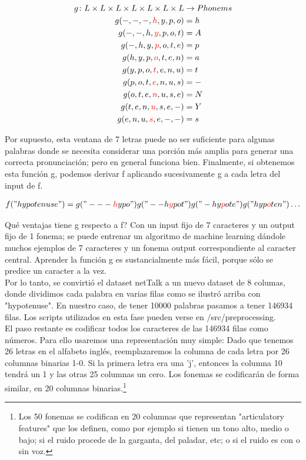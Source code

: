 \documentclass[paper=a4, fontsize=11pt]{scrartcl} %
\numberwithin{equation}{section} %
\numberwithin{figure}{section} %
\numberwithin{table}{section} %
\begin{document}
\begin{align*}
  g \colon L \times L \times L \times L \times L \times L \times L  & \to Phonems \\
  g(-,-,-,\textcolor{red}{h},y,p,o) &= h \\  
  g(-,-,h,\textcolor{red}{y},p,o,t) &= A \\
  g(-,h,y,\textcolor{red}{p},o,t,e) &= p \\
  g(h,y,p,\textcolor{red}{o},t,e,n) &= a \\
  g(y,p,o,\textcolor{red}{t},e,n,u) &= t \\
  g(p,o,t,\textcolor{red}{e},n,u,s)& = - \\
  g(o,t,e,\textcolor{red}{n},u,s,e)& = N \\
  g(t,e,n,\textcolor{red}{u},s,e,-)& = Y \\
  g(e,n,u,\textcolor{red}{s},e,-,-) &= s
\end{align*}

Por supuesto, esta ventana de 7 letras puede no ser suficiente para algunas palabras donde se necesita considerar una porción más amplia para generar una correcta pronunciación; pero en general funciona bien. Finalmente, si obtenemos esta función g, podemos derivar f aplicando sucesivamente g a cada letra del input de f. 

\begin{align*}
  f("hypotenuse") = g("---\textcolor{red}{h}ypo")  g("--h\textcolor{red}{y}pot") g("-hy\textcolor{red}{p}ote") g("hyp\textcolor{red}{o}ten")  \ldots
\end{align*}


Qué ventajas tiene g respecto a f? Con un input fijo de 7 caracteres y un output fijo de 1 fonema; se puede entrenar un algoritmo de machine learning dándole muchos ejemplos de 7 caracteres y un fonema output correspondiente al caracter central. Aprender la función g es sustancialmente más fácil, porque sólo se predice un caracter a la vez. \\

Por lo tanto, se convirtió el dataset netTalk a un nuevo dataset de 8 columas, donde dividimos cada palabra en varias filas como se ilustró arriba con "hypotenuse". En nuestro caso, de tener 10000 palabras pasamos a tener 146934 filas. Los scripts utilizados en esta fase pueden verse en /src/preprocessing. \\

El paso restante es codificar todos los caracteres de las 146934 filas como números. Para ello usaremos una representación muy simple: Dado que tenemos 26 letras en el alfabeto inglés, reemplazaremos la columna de cada letra por 26 columnas binarias 1-0. Si la primera letra era una 'j', entonces la columna 10 tendrá un 1 y las otras 25 columnas un cero. Los fonemas se codificarán de forma similar, en 20 columnas binarias.\footnote{Los 50 fonemas se codifican en 20 columnas que representan "articulatory features" que los definen, como por ejemplo si tienen un tono alto, medio o bajo; si el ruido procede de la garganta, del paladar, etc; o si el ruido es con o sin voz.} \\
\end{document}
